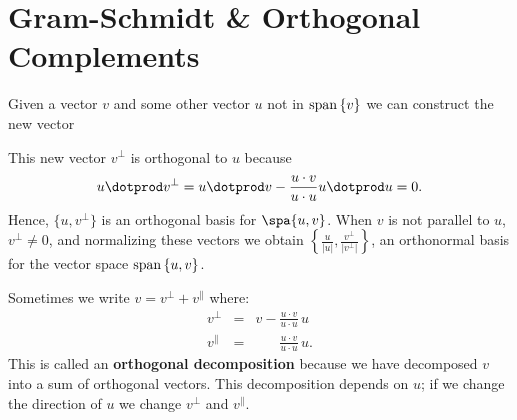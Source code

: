 
%



\section{Gram-Schmidt \& Orthogonal Complements}\label{gramschmidt}


Given a vector $v$ and some other vector $u$ not in  $ {\rm span}\, \{v\} $ we can construct the new vector 
\begin{center}
\hypertarget{projectionpic}{}
\end{center}
This new vector $v^\perp$ is orthogonal to $u$ because 
\[
u\dotprod v^\perp = u\dotprod v - \frac{u\cdot v}{u\cdot u}u\dotprod u = 0.
\]
Hence, $\{u, v^\perp\}$ is an orthogonal basis for $\spa \{u,v\}$.  When $v$ is not parallel to $u$, $v^\perp \neq 0$, and normalizing these vectors we obtain $\left\{\frac{u}{|u|}, \frac{v^\perp}{|v^\perp|} \right\}$, an orthonormal basis for the vector space ${\rm span}\, \{u,v\}$.

Sometimes we write $v = v^\perp + v^\parallel$ where:
\begin{eqnarray*}
v^\perp &=& v-\frac{u\cdot v}{u\cdot u}\, u \\[1mm]
v^\parallel &=& \phantom{v-}\frac{u\cdot v}{u\cdot u}\, u.
\end{eqnarray*}
This is called an {\bfseries orthogonal decomposition} because we have decomposed $v$ into a sum of orthogonal vectors.  This decomposition depends on $u$; if we change the direction of $u$ we change $v^\perp$ and $v^\parallel$.

